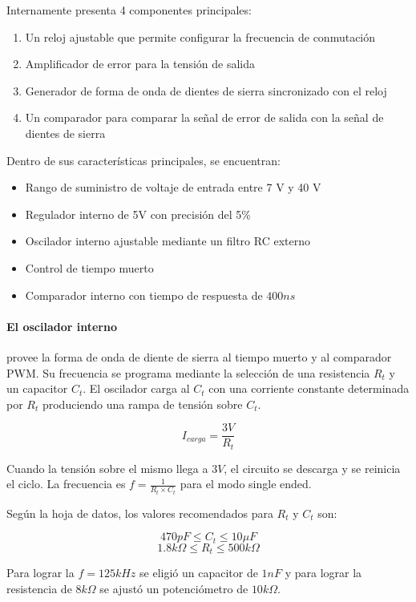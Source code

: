 Internamente presenta 4 componentes principales:
\begin{enumerate}
    \item Un reloj ajustable que permite configurar la frecuencia de conmutación
    \item Amplificador de error para la tensión de salida
    \item Generador de forma de onda de dientes de sierra sincronizado con el reloj
    \item Un comparador para comparar la señal de error de salida con la señal de dientes de sierra
\end{enumerate}

Dentro de sus características principales, se encuentran:
\begin{itemize}
    \item Rango de suministro de voltaje de entrada entre 7 V y 40 V
    \item Regulador interno de 5V con precisión del 5\%
    \item Oscilador interno ajustable mediante un filtro RC externo
    \item Control de tiempo muerto
    \item Comparador interno con tiempo de respuesta de $400ns$
\end{itemize}


\paragraph{El oscilador interno} provee la forma de onda de diente de sierra al tiempo muerto y al comparador PWM. 
Su frecuencia se programa mediante la selección de una resistencia $R_t$ y un capacitor $C_t$. 
El oscilador carga al $C_t$ con una corriente constante determinada por $R_t$ produciendo una rampa de tensión sobre $C_t$.

$$ I_{carga}=\frac{3V}{R_t} $$

Cuando la tensión sobre el mismo llega a $3V$, el circuito se descarga y se reinicia el ciclo. 
La frecuencia es $f=\frac{1}{R_t\times C_t}$ para el modo single ended.

Según la hoja de datos, los valores recomendados para $R_t$ y $C_t$ son:

$$470pF\leq C_t\leq 10\mu F$$
$$1.8k\Omega\leq R_t\leq 500k\Omega$$

Para lograr la $f=125kHz$ se eligió un capacitor de $1nF$ y para lograr la resistencia de $8k\Omega$ se ajustó un potenciómetro de $10k\Omega$. 

